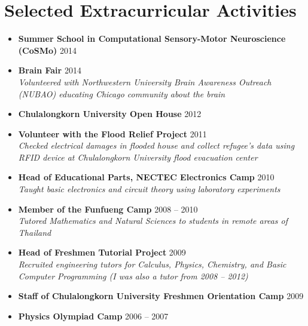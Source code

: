\section{\sc Selected Extracurricular Activities}

\begin{itemize}[leftmargin=0cm, label={}]

\item {\bf Summer School in Computational Sensory-Motor Neuroscience (CoSMo)} \hfill 2014

\item{\bf Brain Fair} \hfill 2014\\
{\em Volunteered with Northwestern University Brain Awareness Outreach (NUBAO) educating Chicago community about the brain}

\item {\bf Chulalongkorn University Open House} \hfill 2012

\item {\bf Volunteer with the Flood Relief Project} \hfill 2011 \\
{\em Checked electrical damages in flooded house and collect refugee's data using RFID device at Chulalongkorn University flood evacuation center}

\item {\bf Head of Educational Parts, NECTEC Electronics Camp} \hfill 2010 \\
{\em Taught basic electronics and circuit theory using laboratory experiments}

\item {\bf Member of the Funfueng Camp}	\hfill 2008 -- 2010 \\
{\em Tutored Mathematics and Natural Sciences to students in remote areas of Thailand}

\item {\bf Head of Freshmen Tutorial Project } \hfill 2009 \\
{\em Recruited engineering tutors for Calculus, Physics, Chemistry, and Basic Computer Programming (I was also a tutor from 2008 -- 2012)}

\item {\bf Staff of Chulalongkorn University Freshmen Orientation Camp} \hfill 2009

\item {\bf Physics Olympiad Camp} \hfill 2006 -- 2007

\end{itemize}
